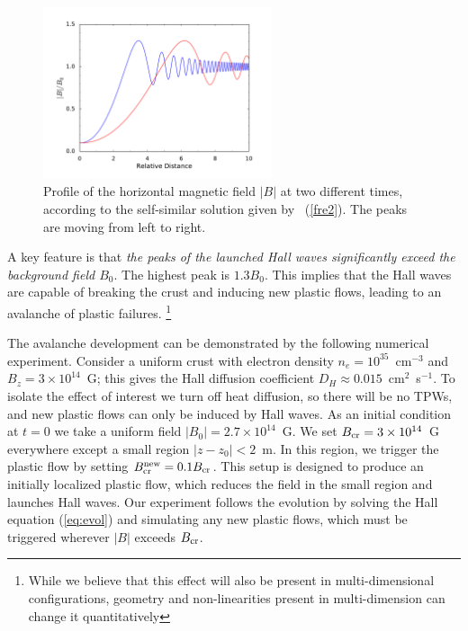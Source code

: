 \begin{figure}[h]
\centering
\includegraphics[width=0.6\textwidth]{pics/chap2/fresnel2.pdf} 
\caption[Profile of the horizontal magnetic field]{Profile of the horizontal magnetic field $|B|$ at two different times,
according to the self-similar solution given by \Eq~(\ref{fre2}). The peaks are
moving from left to right.}
\label{fresnel2}
\end{figure}

A key feature is that {\it the peaks of the launched Hall waves significantly exceed 
the background field $B_0$}. 
The highest peak is $1.3B_0$. This implies that the Hall waves 
are capable of breaking the crust and inducing new plastic flows, leading to an avalanche
of plastic failures.
\footnote{While we believe that this effect will also be present in multi-dimensional configurations, geometry and non-linearities present in multi-dimension can change it quantitatively}

The avalanche development can be demonstrated by the following numerical experiment.
Consider a uniform crust with electron density $n_e = 10^{35}$~cm$^{-3}$ and 
$B_z=3\times 10^{14}$~G; this gives the Hall diffusion coefficient 
$D_H \approx 0.015$~cm$^2$~s$^{-1}$.
To isolate the effect of interest we turn off heat diffusion, so there will be no TPWs, 
and new plastic flows can only be induced by Hall waves. As an initial condition at $t=0$ 
we take a uniform field $|B_0|=2.7\times 10^{14}$~G. We set 
$B_{\rm cr}= 3\times 10^{14}$~G everywhere except a small region $|z-z_0|<2$~m. 
In this region, we trigger the plastic flow by setting $B_{\rm cr}^{\rm new}=0.1B_{\rm cr}$. 
This setup is designed to produce an initially localized plastic flow, which 
reduces the field in the small region and launches Hall waves. Our experiment follows the evolution
by solving the Hall equation (\ref{eq:evol})  and simulating any new plastic flows, which must be
triggered wherever $|B|$ exceeds $B_{\rm cr}$.

